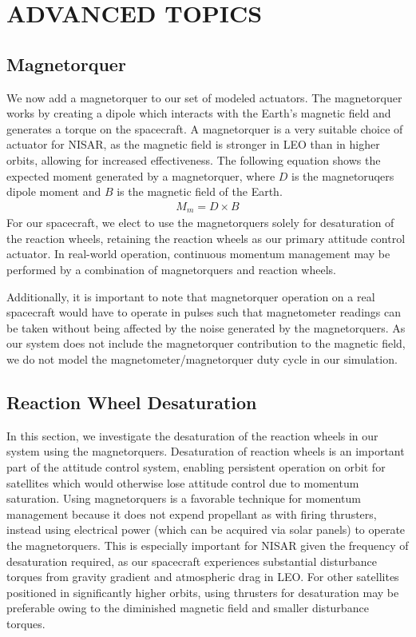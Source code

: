\section{\Large ADVANCED TOPICS}
\subsection{Magnetorquer}
We now add a magnetorquer to our set of modeled actuators. The magnetorquer works by creating a dipole which interacts with the Earth's magnetic field and generates a torque on the spacecraft. A magnetorquer is a very suitable choice of actuator for NISAR, as the magnetic field is stronger in LEO than in higher orbits, allowing for increased effectiveness. The following equation shows the expected moment generated by a magnetorquer, where $D$ is the magnetoruqers dipole moment and $B$ is the magnetic field of the Earth.
\begin{align*}
    M_m = D \times B
\end{align*}
For our spacecraft, we elect to use the magnetorquers solely for desaturation of the reaction wheels, retaining the reaction wheels as our primary attitude control actuator. In real-world operation, continuous momentum management may be performed by a combination of magnetorquers and reaction wheels.

Additionally, it is important to note that magnetorquer operation on a real spacecraft would have to operate in pulses such that magnetometer readings can be taken without being affected by the noise generated by the magnetorquers. As our system does not include the magnetorquer contribution to the magnetic field, we do not model the magnetometer/magnetorquer duty cycle in our simulation.

\subsection{Reaction Wheel Desaturation}
In this section, we investigate the desaturation of the reaction wheels in our system using the magnetorquers. Desaturation of reaction wheels is an important part of the attitude control system, enabling persistent operation on orbit for satellites which would otherwise lose attitude control due to momentum saturation. Using magnetorquers is a favorable technique for momentum management because it does not expend propellant as with firing thrusters, instead using electrical power (which can be acquired via solar panels) to operate the magnetorquers. This is especially important for NISAR given the frequency of desaturation required, as our spacecraft experiences substantial disturbance torques from gravity gradient and atmospheric drag in LEO. For other satellites positioned in significantly higher orbits, using thrusters for desaturation may be preferable owing to the diminished magnetic field and smaller disturbance torques.

